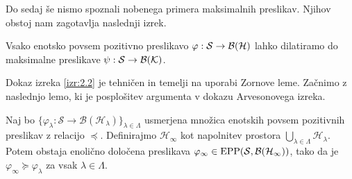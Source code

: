 Do sedaj še nismo spoznali nobenega primera maksimalnih preslikav.
Njihov obstoj nam zagotavlja naslednji izrek.

\begin{izrek}\label{izr:2.2}
    Vsako enotsko povsem pozitivno preslikavo $\varphi: \mathcal{S} \to \operatorname{\mathcal{B} (\mathcal{H})}$ lahko dilatiramo do 
    maksimalne preslikave $\psi: \mathcal{S} \to \operatorname{\mathcal{B} (\mathcal{K})}$.
\end{izrek}

Dokaz izreka \ref{izr:2.2} je tehničen in temelji na uporabi Zornove leme.
Začnimo z naslednjo lemo, ki je posplošitev argumenta v dokazu Arvesonovega izreka.

\begin{lema}\label{lem:2.1}
    Naj bo $\{\varphi_{\lambda} : \mathcal{S} \to \mathcal{B} (\mathcal{H}_\lambda)\}_{\lambda \in \Lambda}$ 
    usmerjena množica enotskih povsem pozitivnih preslikav z relacijo $\preceq$.
    Definirajmo $\mathcal{H}_\infty$ kot napolnitev prostora $\bigcup_{\lambda \in \Lambda} \mathcal{H}_\lambda$.
    Potem obstaja enolično določena preslikava $\varphi_{\infty} \in \operatorname{EPP} (\mathcal{S}, \mathcal{B} (\mathcal{H}_\infty))$,
    tako da je $\varphi_\infty \succeq \varphi_{\lambda}$ za vsak $\lambda \in \Lambda$. 
\end{lema}

